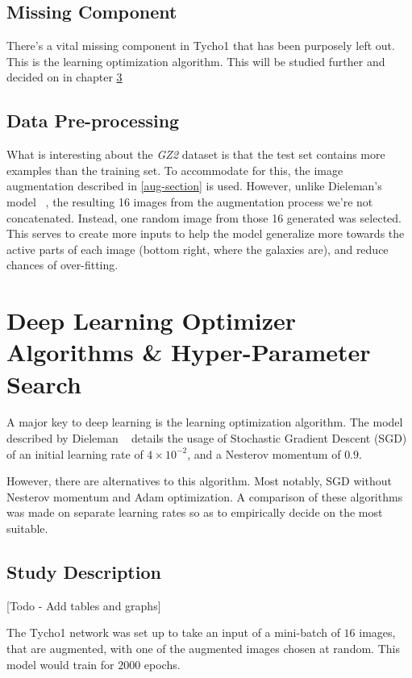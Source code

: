 \documentclass[12pt,a4paper,oneside,oldfontcommands]{memoir}
\begin{document}
\section{Missing Component}
There's a vital missing component in Tycho1 that has been purposely left out. This is the learning optimization algorithm. This will be studied further and decided on in chapter \ref{study}

\section{Data Pre-processing}

What is interesting about the \textit{GZ2} dataset is that the test set contains more examples than the training set. To accommodate for this, the image augmentation described in \ref{aug-section} is used. However, unlike Dieleman's model ~\cite{Sanders-GZ}, the resulting 16 images from the augmentation process we’re not concatenated. Instead, one random image from those 16 generated was selected. This serves to create more inputs to help the model generalize more towards the active parts of each image (bottom right, where the galaxies are), and reduce chances of over-fitting. 

\chapter{Deep Learning Optimizer Algorithms \& Hyper-Parameter Search} \label{study}


A major key to deep learning is the learning optimization algorithm. The model described by Dieleman ~\cite{Sanders-GZ} details the usage of Stochastic Gradient Descent (SGD) of an initial learning rate of \(4\times10^{-2}\), and a Nesterov momentum of \(0.9\). 

However, there are alternatives to this algorithm. Most notably, SGD without Nesterov momentum and Adam optimization. A comparison of these algorithms was made on separate learning rates so as to empirically decide on the most suitable.

\section{Study Description}

[Todo - Add tables and graphs]

The Tycho1 network was set up to take an input of a mini-batch of \(16\) images, that are augmented, with one of the augmented images chosen at random. This model would train for \(2000\) epochs. 
\end{document}
